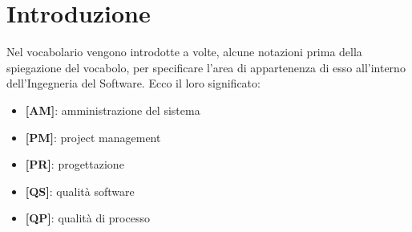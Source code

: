 %
%
%

\section{Introduzione} %
\label{sec:introduzione}
Nel vocabolario vengono introdotte a volte, alcune notazioni prima della spiegazione del vocabolo, per specificare l'area di appartenenza di esso all'interno dell'Ingegneria del Software. Ecco il loro significato:
	\begin{itemize}
		\item \textbf{[AM]}: amministrazione del sistema
		\item \textbf{[PM]}: project management
		\item \textbf{[PR]}: progettazione
		\item \textbf{[QS]}: qualità software
		\item \textbf{[QP]}: qualità di processo
	\end{itemize}

